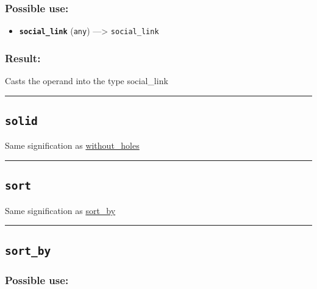 \documentclass[]{book}
\providecommand{\tightlist}{%
  \setlength{\itemsep}{0pt}\setlength{\parskip}{0pt}}
\theoremstyle{definition}
\theoremstyle{definition}
\theoremstyle{definition}
\theoremstyle{remark}
\begin{document}
\subsubsection{Possible use:}\label{possible-use-485}

\begin{itemize}
\tightlist
\item
  \textbf{\texttt{social\_link}} (\texttt{any}) ---\textgreater{}
  \texttt{social\_link}
\end{itemize}

\subsubsection{Result:}\label{result-469}

Casts the operand into the type social\_link

\begin{center}\rule{0.5\linewidth}{\linethickness}\end{center}

\subsection{\texorpdfstring{\texttt{solid}}{solid}}\label{solid}

Same signification as \href{OperatorsSZ\#without_holes}{without\_holes}

\begin{center}\rule{0.5\linewidth}{\linethickness}\end{center}

\subsection{\texorpdfstring{\texttt{sort}}{sort}}\label{sort}

Same signification as \href{OperatorsSZ\#sort_by}{sort\_by}

\begin{center}\rule{0.5\linewidth}{\linethickness}\end{center}

\subsection{\texorpdfstring{\texttt{sort\_by}}{sort\_by}}\label{sort_by}

\subsubsection{Possible use:}\label{possible-use-486}
\end{document}
